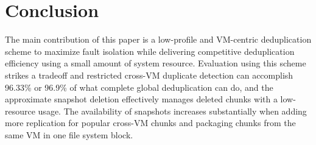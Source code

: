 \section{Conclusion}
\label{sect:conclusion}
The main contribution of this paper is a low-profile and VM-centric deduplication scheme to 
maximize fault isolation while delivering competitive deduplication efficiency using
a small amount of system resource.
Evaluation using  this scheme strikes a tradeoff and restricted cross-VM duplicate detection
can accomplish 96.33\% or 96.9\% of what complete global
deduplication can do, and the approximate snapshot deletion effectively manages deleted chunks with a 
low-resource usage.  The availability of snapshots increases substantially when
adding more replication for popular cross-VM chunks and packaging chunks from the same 
VM in one file system block.


